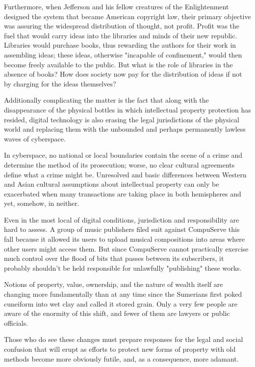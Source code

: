 \documentclass[
]{article}
\begin{document}
Furthermore, when Jefferson and his fellow creatures of the
Enlightenment designed the system that became American copyright law,
their primary objective was assuring the widespread distribution of
thought, not profit. Profit was the fuel that would carry ideas into the
libraries and minds of their new republic. Libraries would purchase
books, thus rewarding the authors for their work in assembling ideas;
these ideas, otherwise "incapable of confinement," would then become
freely available to the public. But what is the role of libraries in the
absence of books? How does society now pay for the distribution of ideas
if not by charging for the ideas themselves?

Additionally complicating the matter is the fact that along with the
disappearance of the physical bottles in which intellectual property
protection has resided, digital technology is also erasing the legal
jurisdictions of the physical world and replacing them with the
unbounded and perhaps permanently lawless waves of cyberspace.

In cyberspace, no national or local boundaries contain the scene of a
crime and determine the method of its prosecution; worse, no clear
cultural agreements define what a crime might be. Unresolved and basic
differences between Western and Asian cultural assumptions about
intellectual property can only be exacerbated when many transactions are
taking place in both hemispheres and yet, somehow, in neither.

Even in the most local of digital conditions, jurisdiction and
responsibility are hard to assess. A group of music publishers filed
suit against CompuServe this fall because it allowed its users to upload
musical compositions into areas where other users might access them. But
since CompuServe cannot practically exercise much control over the flood
of bits that passes between its subscribers, it probably shouldn't be
held responsible for unlawfully "publishing" these works.

Notions of property, value, ownership, and the nature of wealth itself
are changing more fundamentally than at any time since the Sumerians
first poked cuneiform into wet clay and called it stored grain. Only a
very few people are aware of the enormity of this shift, and fewer of
them are lawyers or public officials.

Those who do see these changes must prepare responses for the legal and
social confusion that will erupt as efforts to protect new forms of
property with old methods become more obviously futile, and, as a
consequence, more adamant.
\end{document}

